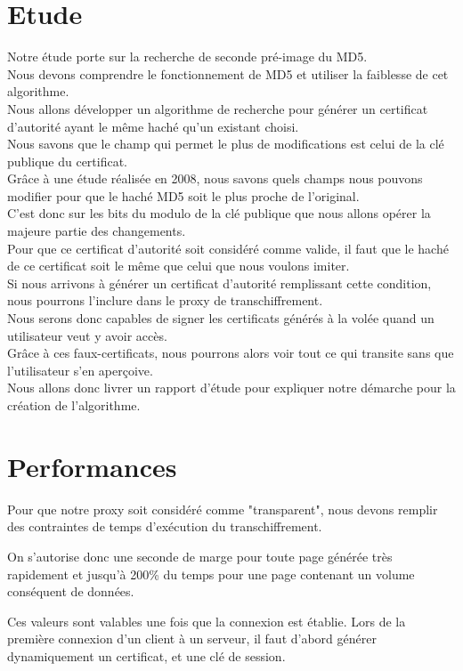 \documentclass[a4paper,11pt,french]{article}
\begin{document}
\section{Etude}

Notre étude porte sur la recherche de seconde pré-image du MD5.\\
Nous devons comprendre le fonctionnement de MD5 et utiliser la faiblesse de cet algorithme.\\
Nous allons développer un algorithme de recherche pour générer un certificat d'autorité ayant le même haché qu'un existant choisi.\\
Nous savons que le champ qui permet le plus de modifications est celui de la clé publique du certificat.\\
Grâce à une étude réalisée en 2008, nous savons quels champs nous pouvons modifier pour que le haché MD5 soit le plus proche de l'original.\\
C'est donc sur les bits du modulo de la clé publique que nous allons opérer la majeure partie des changements.\\
Pour que ce certificat d'autorité soit considéré comme valide, il faut que le haché de ce certificat soit le même que celui que nous voulons imiter.\\
Si nous arrivons à générer un certificat d'autorité remplissant cette condition, nous pourrons l'inclure dans le proxy de transchiffrement.\\
Nous serons donc capables de signer les certificats générés à la volée quand un utilisateur veut y avoir accès.\\
Grâce à ces faux-certificats, nous pourrons alors voir tout ce qui transite sans que l'utilisateur s'en aperçoive.\\
Nous allons donc livrer un rapport d'étude pour expliquer notre démarche pour la création de l'algorithme.\\



\section{Performances}
Pour que notre proxy soit considéré comme "transparent", nous devons remplir des contraintes de temps d'exécution du transchiffrement.

On s'autorise donc une seconde de marge pour toute page générée très rapidement et jusqu'à 200\% du temps pour une page contenant un volume conséquent de données.

Ces valeurs sont valables une fois que la connexion est établie. Lors de la première connexion d'un client à un serveur, il faut d'abord générer dynamiquement un certificat, et une clé de session.
\end{document}
